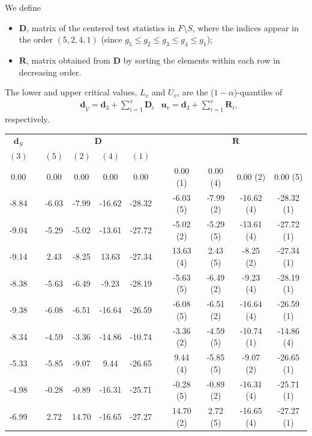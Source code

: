 \documentclass[11pt,a4paper,openright,twoside]{article}
\begin{document}
We define
\begin{itemize}
\item $\mathbf{D}$, matrix of the centered test statistics in $F\setminus S$, where the indices appear in the order $(5,2,4,1)$ (since $g_5\leq g_2\leq g_3\leq g_4\leq g_1$);
\item $\mathbf{R}$, matrix obtained from $\mathbf{D}$ by sorting the elements within each row in decreasing order.
\end{itemize}
The lower and upper critical values, $L_v$ and $U_v$, are the ($1-\alpha$)-quantiles of
\begin{align*}
& \mathbf{d}_{\tilde{V}}=\mathbf{d}_3 + \sum_{i=1}^v \mathbf{D}_i & \mathbf{u}_v=\mathbf{d}_3 + \sum_{i=1}^v \mathbf{R}_i,
\end{align*}
respectively.

\newpage
\begin{table}[h!]
\centering
\begin{tabular}{ccccccccccc}
$\mathbf{d}_S$ & & \multicolumn{4}{c}{$\mathbf{D}$} & & \multicolumn{4}{c}{$\mathbf{R}$}\\
$(3)$ &  & $(5)$ & $(2)$ & $(4)$ & $(1)$ &  &  &  &  &  \\
\cline{1-1} \cline{3-6} \cline{8-11}
0.00 &  & 0.00 & 0.00 & 0.00 & 0.00 &  & 0.00 (1)& 0.00 (4)& 0.00 (2)& 0.00 (5)\\
-8.84 &  & -6.03 & -7.99 & -16.62 & -28.32 &  & -6.03 (5)& -7.99 (2)& -16.62 (4)& -28.32 (1)\\
-9.04 &  & -5.29 & -5.02 & -13.61 & -27.72 &  & -5.02 (2)& -5.29 (5)& -13.61 (4)& -27.72 (1)\\
-9.14 &  & 2.43 & -8.25 & 13.63 & -27.34 &  & 13.63 (4)& 2.43 (5)& -8.25 (2)& -27.34 (1)\\
-8.38 &  & -5.63 & -6.49 & -9.23 & -28.19 &  & -5.63 (5)& -6.49 (2)& -9.23 (4)& -28.19 (1)\\
-9.38 &  & -6.08 & -6.51 & -16.64 & -26.59 &  & -6.08 (5)& -6.51 (2)& -16.64 (4)& -26.59 (1)\\
-8.34 &  & -4.59 & -3.36 & -14.86 & -10.74 &  & -3.36 (2)& -4.59 (5)& -10.74 (1)& -14.86 (4)\\
-5.33 &  & -5.85 & -9.07 & 9.44 & -26.65 &  & 9.44 (4)& -5.85 (5)& -9.07 (2)& -26.65 (1)\\
-4.98 &  & -0.28 & -0.89 & -16.31 & -25.71 &  & -0.28 (5)& -0.89 (2)& -16.31 (4)& -25.71 (1)\\
-6.99 &  & 2.72 & 14.70 & -16.65 & -27.27 &  & 14.70 (2)& 2.72 (5)& -16.65 (4) & -27.27 (1)
\end{tabular}
\end{table}
\end{document}
